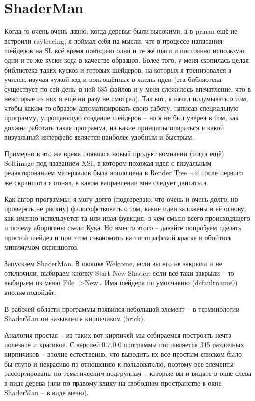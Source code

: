   \chapter*{ShaderMan}
  

 Когда-то очень-очень давно, когда деревья были
    высокими, а в prman ещё не встроили raytracing, я поймал себя на
    мысли, что в процессе написания шейдеров на SL всё время повторяю
    одни и те же шаги и постоянно использую одни и те же куски кода в
    качестве образцов. Более того, у меня скопилась целая библиотека
    таких кусков и готовых шейдеров, на которых я тренировался и
    учился,  изучая чужой
    код и воплощённые в жизнь идеи (эта библиотека существует по сей
    день; в ней 685 файлов и у меня сложилось впечатление, что в
    некоторые из них я ещё ни разу не смотрел). Так вот, я начал
    подумывать о том, чтобы каким-то образом автоматизировать свою
    работу, написав специальную программу, упрощающую создание шейдеров
    – но я не был уверен в том, как должна работать такая программа, на
    какие принципы опираться и какой визуальный интерфейс является
    наиболее удобным и быстрым.
  

 Примерно в это же время появился новый продукт
    комнании (тогда ещё) Softimage под названием XSI, в котором похожая
    идея с визуальным редактированием материалов была воплощена в
    Render Tree – и после первого же скриншота я понял, в каком
    направлении мне следует двигаться.
  

 Как автор программы, я  могу долго (подозреваю, что очень
    и очень долго, но проверять не рискну) философствовать о том, какие
    идеи заложены в её основу, как именно используется та или иная
    функция, в чём смысл всего происходящего и почему аборигены съели
    Кука. Но вместо этого – давайте попробуем сделать простой шейдер и
    при этом сэкономить на типографской краске и обойтись минимумом
    скриншотов.
  

 Запускаем ShaderMan. В окошке Welcome, если вы его
    не закрыли и не отключили, выбираем кнопку Start New Shader; если
    всё-таки закрыли – то выбираем из меню File=>New… Имя шейдера по
    умолчанию (defaultname0) вполне подойдёт.
  

 В рабочей области программы появился небольшой
    элемент – в терминологии ShaderMan он называется кирпичиком
    (brick).
  

  

 Аналогия простая – из таких вот кирпичей мы
    собираемся построить нечто полезное и красивое. С версией 0.7.0.0
    программы поставляется 345 различных кирпичиков – вполне
    естественно, что выводить их все простым списком было бы глупо и
    некрасиво по отношению к пользователю, поэтому все элементы
    рассортированы по тематическим подгруппам – которые вы и видите в
    окне слева в виде дерева (или по правому клику на свободном
    пространстве в окне ShaderMan – в виде меню).
  

